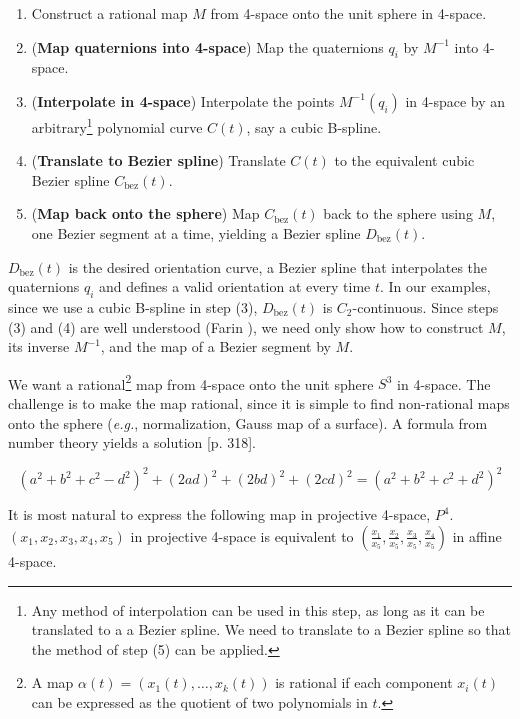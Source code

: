 \begin{enumerate}
\item
	Construct a rational map $M$ from 4-space onto the unit sphere in 
	4-space.
\item
	({\bf Map quaternions into 4-space})
	Map the quaternions $q_i$ by $M^{-1}$ into 4-space.
\item
	({\bf Interpolate in 4-space})
	Interpolate the points $M^{-1}(q_i)$ in 4-space
	by an arbitrary\footnote{Any method of interpolation 
	can be used in this step, as long as it can be translated to a
	a Bezier spline.  We need to translate to a Bezier spline so that
	the method of step (5) can be applied.}
	polynomial curve $C(t)$, say a cubic B-spline.
\item
	({\bf Translate to Bezier spline})
	Translate $C(t)$ to the equivalent cubic Bezier spline 
	$C_{\mbox{bez}}(t)$.
\item
	({\bf Map back onto the sphere})
	Map $C_{\mbox{bez}}(t)$ back to the sphere using $M$, 
	one Bezier segment at a time, yielding a  
	Bezier spline $D_{\mbox{bez}}(t)$. 
\end{enumerate}

$D_{\mbox{bez}}(t)$ is the desired orientation curve, a Bezier spline
that interpolates the quaternions $q_i$ and defines a valid orientation
at every time $t$.
In our examples, since we use a cubic B-spline in step (3),
$D_{\mbox{bez}}(t)$ is $C_2$-continuous.
Since steps (3) and (4) are well understood (Farin \cite{farin93}),
we need only show how to construct $M$, its inverse $M^{-1}$,
and the map of a Bezier segment by $M$.

We want a rational\footnote{A map $\alpha(t) = (x_1(t),\ldots,x_k(t))$
	is rational if each component $x_i(t)$ can be expressed
	as the quotient of two polynomials in $t$.}
map from 4-space onto the unit sphere $S^3$ in
4-space.
The challenge is to make the map rational,
since it is simple to find non-rational maps onto the sphere 
({\em e.g.}, normalization, Gauss map of a surface).
A formula from number theory yields a solution
\cite{Dickson52}[p. 318].

\begin{lemma}
\begin{equation}
\label{eqn:aida}
(a^2 + b^2 + c^2 - d^2)^2 + (2ad)^2 + (2bd)^2 + (2cd)^2 = 
(a^2 + b^2 + c^2 + d^2)^2
\end{equation}
\end{lemma}

It is most natural to express the following map in projective 4-space, $P^4$.
$(x_1,x_2,x_3,x_4,x_5)$ in projective 4-space is equivalent to
$(\frac{x_1}{x_5},\frac{x_2}{x_5},\frac{x_3}{x_5},\frac{x_4}{x_5})$ 
in affine 4-space.


